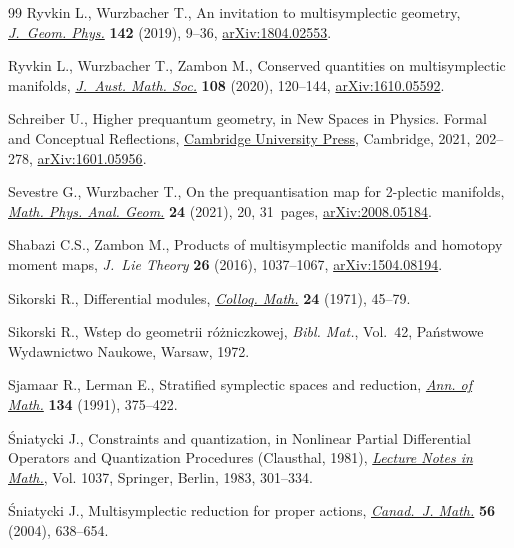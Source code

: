 \documentclass[10pt,a4paper]{amsart}
\numberwithin{equation}{section}
\begin{document}
\begin{thebibliography}{99}
Ryvkin L., Wurzbacher T., An invitation to multisymplectic geometry,
  \href{https://doi.org/10.1016/j.geomphys.2019.03.006}{\textit{J.~Geom. Phys.}} \textbf{142} (2019), 9--36, \href{https://arxiv.org/abs/1804.02553}{arXiv:1804.02553}.

Ryvkin L., Wurzbacher T., Zambon M., Conserved quantities on multisymplectic
  manifolds, \href{https://doi.org/10.1017/s1446788718000381}{\textit{J.~Aust. Math. Soc.}} \textbf{108} (2020), 120--144,
  \href{https://arxiv.org/abs/1610.05592}{arXiv:1610.05592}.

Schreiber U., Higher prequantum geometry, in New Spaces in Physics. Formal and
  Conceptual Reflections, \href{https://doi.org/10.1017/9781108854399.008}{Cambridge University Press}, Cambridge, 2021,
  202--278, \href{https://arxiv.org/abs/1601.05956}{arXiv:1601.05956}.

Sevestre G., Wurzbacher T., On the prequantisation map for 2-plectic manifolds,
  \href{https://doi.org/10.1007/s11040-021-09391-5}{\textit{Math. Phys. Anal. Geom.}} \textbf{24} (2021), 20, 31~pages,
  \href{https://arxiv.org/abs/2008.05184}{arXiv:2008.05184}.

Shabazi C.S., Zambon M., Products of multisymplectic manifolds and homotopy
  moment maps, \textit{J.~Lie Theory} \textbf{26} (2016), 1037--1067,
  \href{https://arxiv.org/abs/1504.08194}{arXiv:1504.08194}.

Sikorski R., Differential modules, \href{https://doi.org/10.4064/cm-24-1-45-79}{\textit{Colloq. Math.}} \textbf{24} (1971),
  45--79.

Sikorski R., Wstep do geometrii r\'o\.zniczkowej, \textit{Bibl. Mat.}, Vol.~42,
  Pa\'nstwowe Wydawnictwo Naukowe, Warsaw, 1972.

Sjamaar R., Lerman E., Stratified symplectic spaces and reduction, \href{https://doi.org/10.2307/2944350}{\textit{Ann.
  of Math.}} \textbf{134} (1991), 375--422.

\'Sniatycki J., Constraints and quantization, in Nonlinear Partial Differential
  Operators and Quantization Procedures ({C}lausthal, 1981), \href{https://doi.org/10.1007/BFb0073178}{\textit{Lecture
  Notes in Math.}}, Vol. 1037, Springer, Berlin, 1983, 301--334.

\'Sniatycki J., Multisymplectic reduction for proper actions, \href{https://doi.org/10.4153/CJM-2004-029-8}{\textit{Canad.~J.
  Math.}} \textbf{56} (2004), 638--654.


\end{thebibliography}
\end{document}
